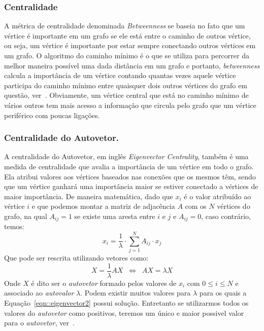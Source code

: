 \subsubsection{Centralidade}
\label{subsubsection::constraint}
A métrica de centralidade denominada \textit{Betweenness} se baseia no fato que um vértice é importante em um grafo se ele está entre o caminho de outros vértice, ou seja, um vértice é importante por estar sempre conectando outros vértices em um grafo. O algoritmo do caminho mínimo é o que se utiliza para percorrer da melhor maneira possível uma dada distância em um grafo e portanto, \textit{betweenness} calcula a importância de um vértice contando quantas vezes aquele vértice participa do caminho mínimo entre quaisquer dois outros vértices do grafo em questão, ver~\cite{Sabidussi66}. Obviamente, um vértice central que está no caminho mínimo de vários outros tem mais acesso a informação que circula pelo grafo que um vértice periférico com poucas ligações.

\subsubsection{Centralidade do Autovetor.}
\label{subsubsection::eigenvector}
A centralidade do Autovetor, em inglês \textit{Eigenvector Centrality}, também é uma medida de centralidade que avalia a importância de um vértice em todo o grafo. Ela atribui valores aos vértices baseados nas conexões que os mesmos têm, sendo que um vértice ganhará uma importância maior se estiver conectado a vértices de maior importância. De maneira matemática, dado que $x_i$ é o valor atribuído ao vértice $i$ e que podemos montar a matriz de adjacência $A$ com os $N$ vértices do grafo, na qual $A_{ij} = 1$ se existe uma aresta entre $i$ e $j$ e $A_{ij}=0$, caso contrário, temos:
\begin{equation}\label{eqn::eigenvector1}
   x_i = \frac{1}{\lambda} \cdot \sum\limits_{j=1}^{N} A_{ij} \cdot x_j
\end{equation}
Que pode ser rescrita utilizando vetores como:
\begin{equation}\label{eqn::eigenvector2}
   X = \frac{1}{\lambda} AX  \;\; \Longleftrightarrow\;\;  AX = \lambda X
\end{equation}
Onde $X$ é dito ser o \textit{autovetor} formado pelos valores de $x_i$ com $0 \leq i \leq N$ e associado ao \textit{autovalor} $\lambda$.  Podem existir muitos valores para $\lambda$ para os quais a Equação~\ref{eqn::eigenvector2} possui solução. Entretanto se utilizarmos todos os valores do \textit{autovetor} como positivos, teremos um único e maior possivel valor para o \textit{autovetor}, ver~\cite{Newman10}. 

